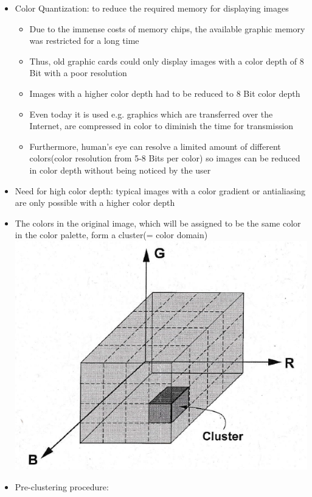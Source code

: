 \documentclass[12pt]{article}
\begin{document}
\begin{itemize}
	\item Color Quantization: to reduce the required memory for displaying images
	\begin{itemize}
		\item Due to the immense costs of memory chips, the available graphic memory was restricted for a long time
		\item Thus, old graphic cards could only display images with a color depth of 8 Bit with a poor resolution
		\item Images with a higher color depth had to be reduced to 8 Bit color depth
		\item Even today it is used e.g. graphics which are transferred over the Internet, are compressed in color to diminish the time for transmission
		\item Furthermore, human's eye can resolve a limited amount of different colors(color resolution from 5-8 Bits per color) so images can be reduced in color depth without being noticed by the user
	\end{itemize}
	\item Need for high color depth: typical images with a color gradient or antialiasing are only possible with a higher color depth
	\item The colors in the original image, which will be assigned to be the same color in the color palette, form a cluster(= color domain) \\
	\includegraphics[scale=0.4]{3_66}
	\item Pre-clustering procedure:
	\begin{itemize}

\end{itemize}
\end{itemize}
\end{document}

